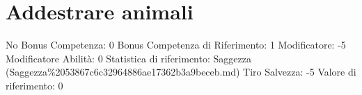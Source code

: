 \section{Addestrare animali}\label{addestrare-animali}

\begin{description}
\tightlist
\item[Tags: ABI]
No Bonus Competenza: 0 Bonus Competenza di Riferimento: 1 Modificatore:
-5 Modificatore Abilità: 0 Statistica di riferimento: Saggezza
(Saggezza\%2053867c6c32964886ae17362b3a9beceb.md) Tiro Salvezza: -5
Valore di riferimento: 0
\end{description}
